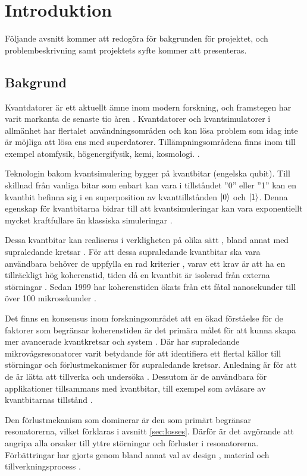 \documentclass[main.tex]{subfiles}
\begin{document}
\chapter{Introduktion}
Följande avsnitt kommer att redogöra för bakgrunden för projektet, och problembeskrivning samt projektets syfte kommer att presenteras.
\section{Bakgrund}
Kvantdatorer är ett aktuellt ämne inom modern forskning, och framstegen har varit markanta de senaste tio åren \cite{Bylander2017}. Kvantdatorer och kvantsimulatorer i allmänhet har flertalet användningsområden och kan lösa problem som idag inte är möjliga att lösa ens med superdatorer. Tillämpningsområdena finns inom till exempel atomfysik, högenergifysik, kemi, kosmologi. \cite{applications}.

Teknologin bakom kvantsimulering bygger på kvantbitar (engelska qubit). Till skillnad från vanliga bitar som enbart kan vara i tillståndet ''0'' eller ''1'' kan en kvantbit befinna sig i en superposition av kvanttillstånden $\ket{0}$ och $\ket{1}$. Denna egenskap för kvantbitarna bidrar till att kvantsimuleringar kan vara exponentiellt mycket kraftfullare än klassiska simuleringar \cite{Eckstein2013}.

Dessa kvantbitar kan realiseras i verkligheten på olika sätt \cite{Eckstein2013}, bland annat med supraledande kretsar \cite{Oliver2013}. För att dessa supraledande kvantbitar ska vara användbara behöver de uppfylla en rad kriterier \cite{Eckstein2013}, varav ett krav är att ha en tillräckligt hög koherenstid, tiden då en kvantbit är isolerad från externa störningar \cite{Oliver2013}. Sedan 1999 har koherenstiden ökats från ett fåtal nanosekunder till över 100 mikrosekunder \cite{wendin2016}.

Det finns en konsensus inom forskningsområdet att en ökad förståelse för de faktorer som begränsar koherenstiden är det primära målet för att kunna skapa mer avancerade kvantkretsar och system \cite{Oliver2013}. Där har supraledande mikrovågsresonatorer varit betydande för att identifiera ett flertal källor till störningar och förlustmekanismer för supraledande kretsar. Anledning är för att de är lätta att tillverka och undersöka \cite{Oliver2013}. Dessutom är de användbara för applikationer tillsammans med kvantbitar, till exempel som avläsare av kvantbitarnas tillstånd \cite{wendin2016}.

Den förlustmekanism som dominerar är den som primärt begränsar resonatorerna, vilket förklaras i avsnitt \ref{sec:losses}. Därför är det avgörande att angripa alla orsaker till yttre störningar och förluster i resonatorerna. Förbättringar har gjorts genom bland annat val av design \cite{khalil2011,chiaro2016}, material \cite{Goetz2016} och tillverkningsprocess \cite{Bruno2015,Sanberg2012}.
\end{document}

